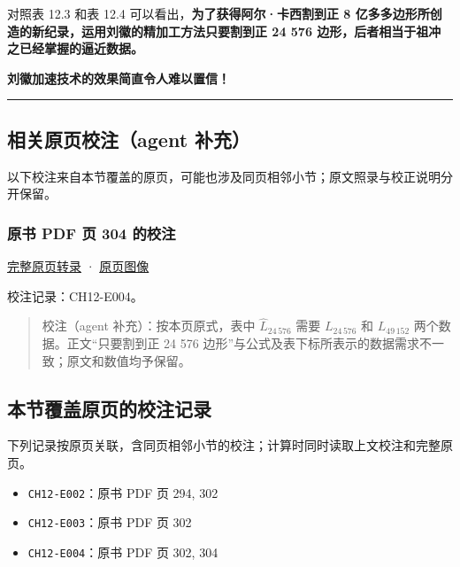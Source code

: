 \documentclass[
  10pt,
  fontset=fandol]{ctexart}
\providecommand{\tightlist}{%
  \setlength{\itemsep}{0pt}\setlength{\parskip}{0pt}}
\begin{document}
对照表 12.3 和表 12.4 可以看出，\textbf{为了获得阿尔·卡西割到正 8 亿多多边形所创造的新纪录，运用刘徽的精加工方法只要割到正 24 576 边形，后者相当于祖冲之已经掌握的逼近数据。}

\textbf{刘徽加速技术的效果简直令人难以置信！}

\begin{center}\rule{0.5\linewidth}{0.5pt}\end{center}

\subsection{相关原页校注（agent 补充）}\label{ux76f8ux5173ux539fux9875ux6821ux6ce8agent-ux8865ux5145}

以下校注来自本节覆盖的原页，可能也涉及同页相邻小节；原文照录与校正说明分开保留。

\subsubsection{原书 PDF 页 304 的校注}\label{ux539fux4e66-pdf-ux9875-304-ux7684ux6821ux6ce8}

\href{../pages/pdf-304.md}{完整原页转录} · \href{../../source-images/pdf-304.jpeg}{原页图像}

校注记录：CH12-E004。

\begin{quote}
校注（agent 补充）：按本页原式，表中 \(\widehat L_{24\,576}\) 需要 \(L_{24\,576}\) 和 \(L_{49\,152}\) 两个数据。正文``只要割到正 24 576 边形''与公式及表下标所表示的数据需求不一致；原文和数值均予保留。
\end{quote}

\subsection{本节覆盖原页的校注记录}\label{ux672cux8282ux8986ux76d6ux539fux9875ux7684ux6821ux6ce8ux8bb0ux5f55}

下列记录按原页关联，含同页相邻小节的校注；计算时同时读取上文校注和完整原页。

\begin{itemize}
\tightlist
\item
  \texttt{CH12-E002}：原书 PDF 页 294, 302
\item
  \texttt{CH12-E003}：原书 PDF 页 302
\item
  \texttt{CH12-E004}：原书 PDF 页 302, 304
\end{itemize}
\end{document}
